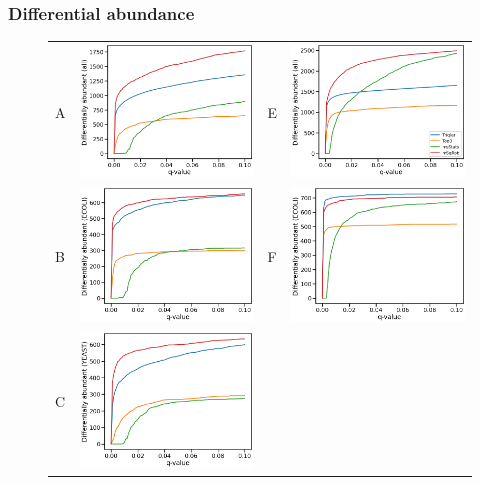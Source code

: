 \documentclass[11pt]{article}
\begin{document}
\subsubsection*{Differential abundance}
\begin{figure}[hbt]
    \centering
    \begin{tabular}{lclc} 
        A & \includegraphics[width=0.4\linewidth]{../../result/report_plots/osw_de_all.png} & 
        E & \includegraphics[width=0.4\linewidth]{../../result/report_plots/diann_de_all.png} \\ 
        B & \includegraphics[width=0.4\linewidth]{../../result/report_plots/osw_de_ecoli.png} & 
        F & \includegraphics[width=0.4\linewidth]{../../result/report_plots/diann_de_ecoli.png} \\ 
        C & \includegraphics[width=0.4\linewidth]{../../result/report_plots/osw_de_yeast.png} & 

\end{tabular}
\end{figure}
\end{document}
